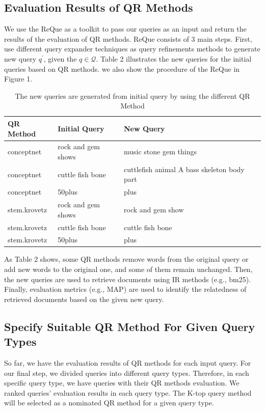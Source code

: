 \documentclass[sigconf]{acmart}
\begin{document}
\subsection{Evaluation Results of QR Methods}
We use the ReQue \cite{tamannaee2020reque} as a toolkit to pass our queries as an input and return the results of the evaluation of QR methods. ReQue consists of 3 main steps. First, use different query expander techniques as query refinements methods to generate new query ${q^'}$, given the ${q}\in\mathcal{Q}$. Table 2 illustrates the new queries for the initial queries based on QR methods. we also show the procedure of the ReQue in Figure 1.

\begin{table}[h]
\begin{tabularx}{0.43\textwidth} { 
  | >{\raggedright\arraybackslash}X 
  | >{\centering\arraybackslash}X 
  | >{\centering\arraybackslash}X
  | >{\raggedright\arraybackslash}X | }
 \hline
QR Method & Initial Query & New Query \\
 \hline
conceptnet  & rock and gem shows & music stone gem things \\
 \hline
conceptnet  & cuttle fish bone & cuttlefish animal A bass skeleton body part\\
\hline 
conceptnet  & 50plus & plus\\
\hline 
stem.krovetz  & rock and gem shows & rock and gem show \\
\hline
stem.krovetz  & cuttle fish bone & cuttle fish bone\\
\hline
stem.krovetz  & 50plus & plus\\
\hline
\end{tabularx}
\caption{\label{tab:table-name}The new queries are generated from initial query by using the different QR Method }
\end{table}

As Table 2 shows, some QR methods remove words from the original query or add new words to the original one, and some of them remain unchanged. Then, the new queries are used to retrieve documents using IR methods (e.g., bm25). Finally, evaluation metrics (e.g., MAP) are used to identify the relatedness of retrieved documents based on the given new query.


\subsection{Specify Suitable QR Method For Given Query Types}
So far, we have the evaluation results of QR methods for each input query. For our final step, we divided queries into different query types. Therefore, in each specific query type, we have queries with their QR methods evaluation. We ranked queries' evaluation results in each query type. The K-top query method will be selected as a nominated QR method for a given query type. 
\end{document}
